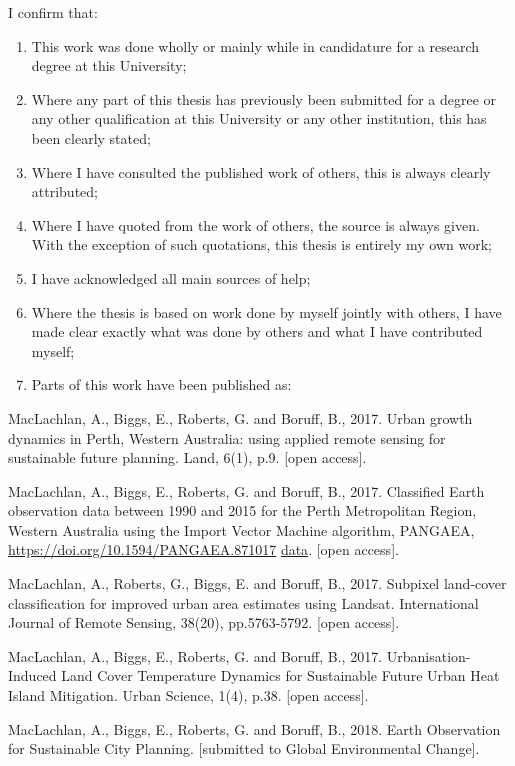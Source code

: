 \documentclass[]{book}
\begin{document}
I confirm that:

\begin{enumerate}
\def\labelenumi{\arabic{enumi}.}
\item
  This work was done wholly or mainly while in candidature for a
  research degree at this University;
\item
  Where any part of this thesis has previously been submitted for a
  degree or any other qualification at this University or any other
  institution, this has been clearly stated;
\item
  Where I have consulted the published work of others, this is always
  clearly attributed;
\item
  Where I have quoted from the work of others, the source is always
  given. With the exception of such quotations, this thesis is entirely
  my own work;
\item
  I have acknowledged all main sources of help;
\item
  Where the thesis is based on work done by myself jointly with others,
  I have made clear exactly what was done by others and what I have
  contributed myself;
\item
  Parts of this work have been published as:
\end{enumerate}

MacLachlan, A., Biggs, E., Roberts, G. and Boruff, B., 2017. Urban
growth dynamics in Perth, Western Australia: using applied remote
sensing for sustainable future planning. Land, 6(1), p.9. {[}open
access{]}.

MacLachlan, A., Biggs, E., Roberts, G. and Boruff, B., 2017. Classified
Earth observation data between 1990 and 2015 for the Perth Metropolitan
Region, Western Australia using the Import Vector Machine algorithm,
PANGAEA, \url{https://doi.org/10.1594/PANGAEA.871017}
\protect\hyperlink{data}{data}. {[}open access{]}.

MacLachlan, A., Roberts, G., Biggs, E. and Boruff, B., 2017. Subpixel
land-cover classification for improved urban area estimates using
Landsat. International Journal of Remote Sensing, 38(20), pp.5763-5792.
{[}open access{]}.

MacLachlan, A., Biggs, E., Roberts, G. and Boruff, B., 2017.
Urbanisation-Induced Land Cover Temperature Dynamics for Sustainable
Future Urban Heat Island Mitigation. Urban Science, 1(4), p.38. {[}open
access{]}.

MacLachlan, A., Biggs, E., Roberts, G. and Boruff, B., 2018. Earth
Observation for Sustainable City Planning. {[}submitted to Global
Environmental Change{]}.
\end{document}
